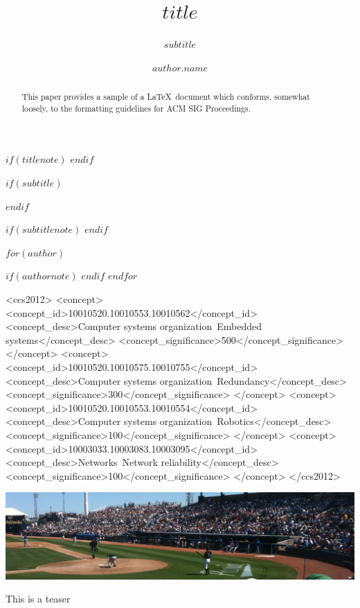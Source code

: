 \documentclass[sigchi, $if(review)$review,$endif$$if(anonymous)$anonymous,$endif$]{acmart}
\begin{document}
\title[$short-title$]{$title$}

$if(titlenote)$
$endif$

$if(subtitle)$
\subtitle{$subtitle$}
$endif$

$if(subtitlenote)$
$endif$

$for(author)$
\author{$author.name$}
$if(authornote)$
$endif$
$endfor$

\renewcommand{\shortauthors}{B. Trovato et al.}


\begin{abstract}
This paper provides a sample of a \LaTeX\ document which conforms,
somewhat loosely, to the formatting guidelines for
ACM SIG Proceedings.
\end{abstract}

%
%
\begin{CCSXML}
<ccs2012>
 <concept>
  <concept_id>10010520.10010553.10010562</concept_id>
  <concept_desc>Computer systems organization~Embedded systems</concept_desc>
  <concept_significance>500</concept_significance>
 </concept>
 <concept>
  <concept_id>10010520.10010575.10010755</concept_id>
  <concept_desc>Computer systems organization~Redundancy</concept_desc>
  <concept_significance>300</concept_significance>
 </concept>
 <concept>
  <concept_id>10010520.10010553.10010554</concept_id>
  <concept_desc>Computer systems organization~Robotics</concept_desc>
  <concept_significance>100</concept_significance>
 </concept>
 <concept>
  <concept_id>10003033.10003083.10003095</concept_id>
  <concept_desc>Networks~Network reliability</concept_desc>
  <concept_significance>100</concept_significance>
 </concept>
</ccs2012>
\end{CCSXML}




\begin{teaserfigure}
  \includegraphics[width=\textwidth]{sampleteaser}
  \caption{This is a teaser}
  \label{fig:teaser}
\end{teaserfigure}


\maketitle





\end{document}
